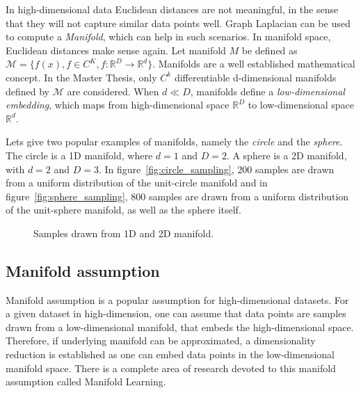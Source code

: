 In high-dimensional data Euclidean distances are not meaningful,
in the sense that they will not capture similar data points well.
Graph Laplacian can be used to compute a \textit{Manifold}, which can help in such scenarios. 
In manifold space, Euclidean distances make sense again. 
Let manifold $M$ be defined as $\mathcal{M} = \{ f(x), f \in C^K, f: \mathbb{R}^D \to \mathbb{R}^d \}$.
Manifolds are a well established mathematical concept. In the Master Thesis, only 
$C^k$ differentiable d-dimensional manifolds defined by $\mathcal{M}$ are considered. 
When $d \ll D$, manifolds define a \textit{low-dimensional embedding}, which maps from high-dimensional space 
$\mathbb{R}^D$ to low-dimensional space $\mathbb{R}^d$.

Lets give two popular examples of manifolds, namely the \textit{circle} and the \textit{sphere}.
The circle is a 1D manifold, where $d=1$ and $D=2$. A sphere is a 2D manifold, with $d=2$ and $D=3$.
In figure~\ref{fig:circle_sampling}, 200 samples are drawn from a uniform distribution of the unit-circle manifold
and in figure~\ref{fig:sphere_sampling}, 800 samples are drawn from a uniform distribution of the unit-sphere manifold,
as well as the sphere itself.

\begin{figure}[H]
    \centering
    \caption{Samples drawn from 1D and 2D manifold.}
\end{figure}


\subsection{Manifold assumption}
\label{sec:manifoldAssumption}
Manifold assumption is a popular assumption for high-dimensional datasets.
For a given dataset in high-dimension, one can assume that data points are samples drawn from a low-dimensional manifold,
that embeds the high-dimensional space. 
Therefore, if underlying manifold can be approximated, a dimensionality reduction
is established as one can embed data points in the low-dimensional manifold space.
There is a complete area of research devoted to this manifold assumption called Manifold Learning\cite{ManifoldLearning}.

